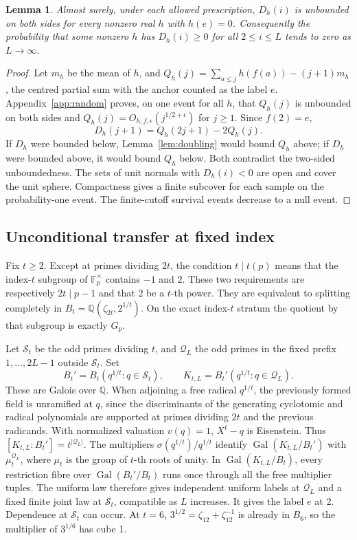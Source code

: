 \documentclass[11pt,reqno]{amsart}
\newtheorem{lemma}[theorem]{Lemma}
\newcommand{\Q}{\mathbb Q}
\newcommand{\F}{\mathbb F}
\begin{document}
\begin{lemma}\label{lem:random}
Almost surely, under each allowed prescription, \(D_h(i)\) is unbounded on both sides for every nonzero real \(h\) with \(h(e)=0\). Consequently the probability that some nonzero \(h\) has \(D_h(i)\ge0\) for all \(2\le i\le L\) tends to zero as \(L\to\infty\).
\end{lemma}
\begin{proof}
Let \(m_h\) be the mean of \(h\), and \(Q_h(j)=\sum_{a\le j}h(f(a))-(j+1)m_h\), the centred partial sum with the anchor counted as the label \(e\). Appendix~\ref{app:random} proves, on one event for all \(h\), that \(Q_h(j)\) is unbounded on both sides and \(Q_h(j)=O_{h,f,\epsilon}(j^{1/2+\epsilon})\) for \(j\ge1\). Since \(f(2)=e\),
\[
 D_h(j+1)=Q_h(2j+1)-2Q_h(j).
\]
If \(D_h\) were bounded below, Lemma~\ref{lem:doubling} would bound \(Q_h\) above; if \(D_h\) were bounded above, it would bound \(Q_h\) below. Both contradict the two-sided unboundedness. The sets of unit normals with \(D_h(i)<0\) are open and cover the unit sphere. Compactness gives a finite subcover for each sample on the probability-one event. The finite-cutoff survival events decrease to a null event.
\end{proof}

\subsection*{Unconditional transfer at fixed index}
Fix \(t\ge2\). Except at primes dividing \(2t\), the condition \(t\mid t(p)\) means that the index-\(t\) subgroup of \(\F_p^\times\) contains \(-1\) and 2. These two requirements are respectively \(2t\mid p-1\) and that 2 be a \(t\)-th power. They are equivalent to splitting completely in \(B_t=\Q(\zeta_{2t},2^{1/t})\). On the exact index-\(t\) stratum the quotient by that subgroup is exactly \(G_p\).

Let \(\mathcal S_t\) be the odd primes dividing \(t\), and \(\mathcal Q_L\) the odd primes in the fixed prefix \(1,\ldots,2L-1\) outside \(\mathcal S_t\). Set
\[
 B_t'=B_t(q^{1/t}:q\in\mathcal S_t),\qquad K_{t,L}=B_t'(q^{1/t}:q\in\mathcal Q_L).
\]
These are Galois over \(\Q\). When adjoining a free radical \(q^{1/t}\), the previously formed field is unramified at \(q\), since the discriminants of the generating cyclotomic and radical polynomials are supported at primes dividing \(2t\) and the previous radicands. With normalized valuation \(v(q)=1\), \(X^t-q\) is Eisenstein. Thus \([K_{t,L}:B_t']=t^{|\mathcal Q_L|}\). The multipliers \(\sigma(q^{1/t})/q^{1/t}\) identify \(\operatorname{Gal}(K_{t,L}/B_t')\) with \(\mu_t^{\mathcal Q_L}\), where \(\mu_t\) is the group of \(t\)-th roots of unity. In \(\operatorname{Gal}(K_{t,L}/B_t)\), every restriction fibre over \(\operatorname{Gal}(B_t'/B_t)\) runs once through all the free multiplier tuples. The uniform law therefore gives independent uniform labels at \(\mathcal Q_L\) and a fixed finite joint law at \(\mathcal S_t\), compatible as \(L\) increases. It gives the label \(e\) at 2. Dependence at \(\mathcal S_t\) can occur. At \(t=6\), \(3^{1/2}=\zeta_{12}+\zeta_{12}^{-1}\) is already in \(B_6\), so the multiplier of \(3^{1/6}\) has cube 1.
\end{document}
